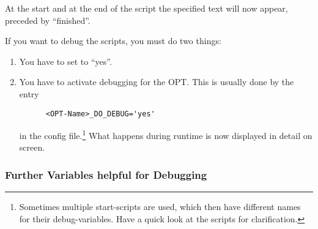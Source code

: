At the start and at the end of the script the specified text will now appear,
preceded by ``finished''.

If you want to debug the scripts, you must do two things:

\begin{enumerate}

\item You have to set  to ``yes''.
\item You have to activate debugging for the OPT. This is usually done by the
  entry
\begin{example}
\begin{verbatim}
      <OPT-Name>_DO_DEBUG='yes'
\end{verbatim}
\end{example}
in the config file.\footnote{Sometimes multiple start-scripts are used,
  which then have different names for their debug-variables. Have a quick look at the scripts for clarification.}
    What happens during runtime is now displayed in detail on screen.
\end{enumerate}


\subsubsection{Further Variables helpful for Debugging}

